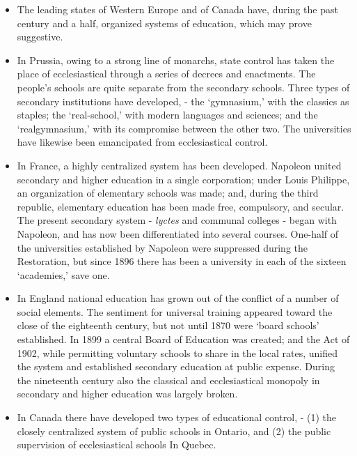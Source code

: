 \documentclass[
]{book}
\providecommand{\tightlist}{%
  \setlength{\itemsep}{0pt}\setlength{\parskip}{0pt}}
\begin{document}
\begin{itemize}
\tightlist
\item
  The leading states of Western Europe and of Canada have, during the past century and a half, organized systems of education, which may prove suggestive.
\item
  In Prussia, owing to a strong line of monarchs, state control has taken the place of ecclesiastical through a series of decrees and enactments. The people's schools are quite separate from the secondary schools. Three types of secondary institutions have developed, - the `gymnasium,' with the classics as staples; the `real-school,' with modern languages and sciences; and the `realgymnasium,' with its compromise between the other two. The universities have likewise been emancipated from ecclesiastical control.
\item
  In France, a highly centralized system has been developed. Napoleon united secondary and higher education in a single corporation; under Louis Philippe, an organization of elementary schools was made; and, during the third republic, elementary education has been made free, compulsory, and secular. The present secondary system - \emph{lyctes} and communal colleges - began with Napoleon, and has now been differentiated into several courses. One-half of the universities established by Napoleon were suppressed during the Restoration, but since 1896 there has been a university in each of the sixteen `academies,' save one.
\item
  In England national education has grown out of the conflict of a number of social elements. The sentiment for universal training appeared toward the close of the eighteenth century, but not until 1870 were `board schools' established. In 1899 a central Board of Education was created; and the Act of 1902, while permitting voluntary schools to share in the local rates, unified the system and established secondary education at public expense. During the nineteenth century also the classical and ecclesiastical monopoly in secondary and higher education was largely broken.
\item
  In Canada there have developed two types of educational control, - (1) the closely centralized system of public schools in Ontario, and (2) the public supervision of ecclesiastical schools In Quebec.
\end{itemize}
\end{document}
